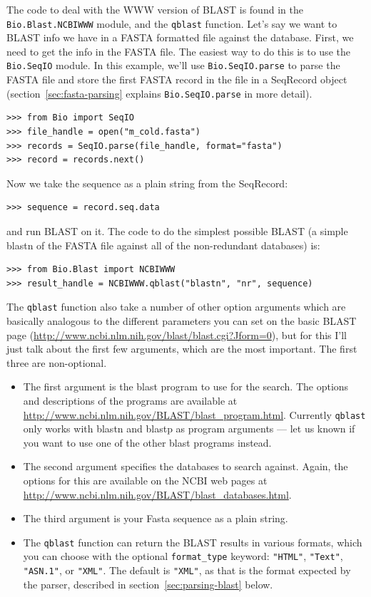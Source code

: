 \documentclass{report}
\begin{document}
The code to deal with the WWW version of BLAST is found in the
\verb|Bio.Blast.NCBIWWW| module, and the \verb|qblast| function. Let's
say we want to BLAST info we have in a FASTA formatted file against
the database. First, we need to get the info in the FASTA file. The
easiest way to do this is to use the \verb|Bio.SeqIO| module.
In this example, we'll use \verb|Bio.SeqIO.parse| to parse the FASTA file
and store the first FASTA record in the file in a SeqRecord object
(section~\ref{sec:fasta-parsing} explains \verb|Bio.SeqIO.parse| in
more detail).

\begin{verbatim}
>>> from Bio import SeqIO
>>> file_handle = open("m_cold.fasta")
>>> records = SeqIO.parse(file_handle, format="fasta")
>>> record = records.next()
\end{verbatim}

Now we take the sequence as a plain string from the SeqRecord:
\begin{verbatim}
>>> sequence = record.seq.data
\end{verbatim}
and run BLAST on it. The code to do the simplest possible BLAST
(a simple blastn of the FASTA file against all of the non-redundant
databases) is:

\begin{verbatim}
>>> from Bio.Blast import NCBIWWW
>>> result_handle = NCBIWWW.qblast("blastn", "nr", sequence)
\end{verbatim}

The \verb|qblast| function also take a number of other option arguments
which are basically analogous to the different parameters you can set
on the basic BLAST page
(\url{http://www.ncbi.nlm.nih.gov/blast/blast.cgi?Jform=0}),
but for this I'll just talk about the first few arguments, which are
the most important. The first three are non-optional.

\begin{itemize}
\item The first argument is the blast program to use for the search. The
options and descriptions of the programs are available at
\url{http://www.ncbi.nlm.nih.gov/BLAST/blast_program.html}.
Currently \verb|qblast| only works with blastn and blastp as program
arguments --- let us known if you want to use one of the other blast
programs instead.
\item The second argument specifies the databases to search against. Again,
the options for this are available on the NCBI web pages at
\url{http://www.ncbi.nlm.nih.gov/BLAST/blast_databases.html}.
\item The third argument is your Fasta sequence as a plain string.
\item The \verb|qblast| function can return the BLAST results in various
formats, which you can choose with the optional \verb|format_type| keyword:
\verb|"HTML"|, \verb|"Text"|, \verb|"ASN.1"|, or \verb|"XML"|.
The default is \verb|"XML"|, as that is the format expected by the parser,
described in section~\ref{sec:parsing-blast} below.
\end{itemize}
\end{document}
